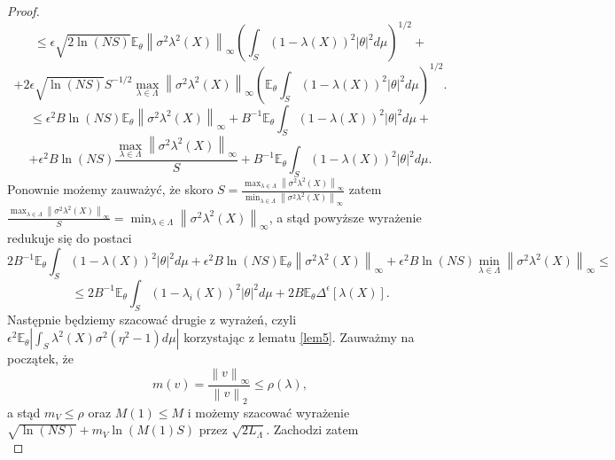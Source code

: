 \documentclass{article}
\newcommand{\norm}[1]{\left\lVert#1\right\rVert}
\begin{document}
\begin{proof}
\begin{displaymath}
\leq \epsilon\sqrt{2\ln (NS)}\mathbb{E}_{\theta}\norm{\sigma^2\lambda^2(X)}_{\infty}\left(\int_S(1-\lambda(X))^2|\theta |^2d\mu\right)^{1/2}+
\end{displaymath}
\begin{displaymath}
+2\epsilon\sqrt{\ln (NS)}S^{-1/2}\max_{\lambda\in \Lambda}\norm{\sigma^2\lambda^2(X)}_{\infty}\left(\mathbb{E}_{\theta}\int_S(1-\lambda(X))^2|\theta |^2d\mu\right)^{1/2}.
\end{displaymath}
\begin{displaymath}
\leq \epsilon^2B\ln (NS)\mathbb{E}_{\theta}\norm{\sigma^2\lambda^2(X)}_{\infty}+B^{-1}\mathbb{E}_{\theta}\int_S(1-\lambda(X))^2|\theta |^2d\mu+
\end{displaymath}
\begin{displaymath}
+\epsilon^2B\ln (NS)\frac{\max_{\lambda\in \Lambda}\norm{\sigma^2\lambda^2(X)}_{\infty}}{S}+B^{-1}\mathbb{E}_{\theta}\int_S(1-\lambda(X))^2|\theta |^2d\mu.
\end{displaymath}
Ponownie możemy zauważyć, że skoro $S=\frac{\max_{\lambda\in \Lambda}\norm{\sigma^2\lambda^2(X)}_{\infty}}{\min_{\lambda\in \Lambda}\norm{\sigma^2\lambda^2(X)}_{\infty}}$ zatem $\frac{\max_{\lambda\in \Lambda}\norm{\sigma^2\lambda^2(X)}_{\infty}}{S}=\min_{\lambda\in \Lambda}\norm{\sigma^2\lambda^2(X)}_{\infty}$, a stąd powyższe wyrażenie redukuje się do postaci
\begin{displaymath}
2B^{-1}\mathbb{E}_{\theta}\int_S(1-\lambda(X))^2|\theta |^2d\mu+\epsilon^2B\ln (NS)\mathbb{E}_{\theta}\norm{\sigma^2\lambda^2(X)}_{\infty}+\epsilon^2B\ln (NS)\min_{\lambda\in \Lambda}\norm{\sigma^2\lambda^2(X)}_{\infty}\leq
\end{displaymath}
\begin{displaymath}
\leq 2B^{-1}\mathbb{E}_{\theta}\int_S(1-\lambda_i(X))^2|\theta |^2d\mu+2B\mathbb{E}_{\theta}\Delta^{\epsilon}[\lambda(X)].
\end{displaymath}
Następnie będziemy szacować drugie z  wyrażeń, czyli $\epsilon^2\mathbb{E}_{\theta}\left|\int_S\lambda^2(X)\sigma^2(\eta^2-1)d\mu\right|$ korzystając z lematu \ref{lem5}.  Zauważmy na początek, że 
\begin{displaymath}
m(v)=\frac{\norm{v}_{\infty}}{\norm{v}_2}\leq \rho (\lambda),
\end{displaymath}
a stąd $m_V\leq\rho$ oraz $M(1)\leq M$ i możemy szacować wyrażenie $\sqrt{\ln (NS)}+m_V\ln (M(1)S)$ przez $\sqrt{2L_{\Lambda}}$. Zachodzi zatem
\begin{displaymath}

\end{displaymath}
\end{proof}
\end{document}
